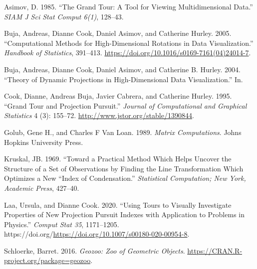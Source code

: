 \hypertarget{refs}{}
\begin{CSLReferences}{1}{0}
\leavevmode{}%
Asimov, D. 1985. {``The Grand Tour: A Tool for Viewing Multidimensional Data.''} \emph{SIAM J Sci Stat Comput 6(1)}, 128--43.

\leavevmode{}%
Buja, Andreas, Dianne Cook, Daniel Asimov, and Catherine Hurley. 2005. {``Computational Methods for High-Dimensional Rotations in Data Visualization.''} \emph{Handbook of Statistics}, 391--413. \url{https://doi.org/10.1016/s0169-7161(04)24014-7}.

\leavevmode{}%
Buja, Andreas, Dianne Cook, Daniel Asimov, and Catherine B. Hurley. 2004. {``Theory of Dynamic Projections in High-Dimensional Data Visualization.''} In.

\leavevmode{}%
Cook, Dianne, Andreas Buja, Javier Cabrera, and Catherine Hurley. 1995. {``Grand Tour and Projection Pursuit.''} \emph{Journal of Computational and Graphical Statistics} 4 (3): 155--72. \url{http://www.jstor.org/stable/1390844}.

\leavevmode{}%
Golub, Gene H., and Charles F Van Loan. 1989. \emph{Matrix Computations}. Johns Hopkins University Press.

\leavevmode{}%
Kruskal, JB. 1969. {``Toward a Practical Method Which Helps Uncover the Structure of a Set of Observations by Finding the Line Transformation Which Optimizes a New ``Index of Condensation.''} \emph{Statistical Computation; New York, Academic Press}, 427--40.

\leavevmode{}%
Laa, Ursula, and Dianne Cook. 2020. {``Using Tours to Visually Investigate Properties of New Projection Pursuit Indexes with Application to Problems in Physics.''} \emph{Comput Stat 35}, 1171--1205. https://doi.org/\url{https://doi.org/10.1007/s00180-020-00954-8}.

\leavevmode{}%
Schloerke, Barret. 2016. \emph{Geozoo: Zoo of Geometric Objects}. \url{https://CRAN.R-project.org/package=geozoo}.

\end{CSLReferences}



\address{%
Zoljargal Batsaikhan\\
Monash University\\%
Department of Letter Q\\ Somewhere, Australia\\
%
\url{https://www.britannica.com/animal/quokka}\\%
\textit{ORCiD: \href{https://orcid.org/N/A}{N/A}}\\%
\href{mailto:zoljargal11@gmail.com}{\nolinkurl{zoljargal11@gmail.com}}%
}

